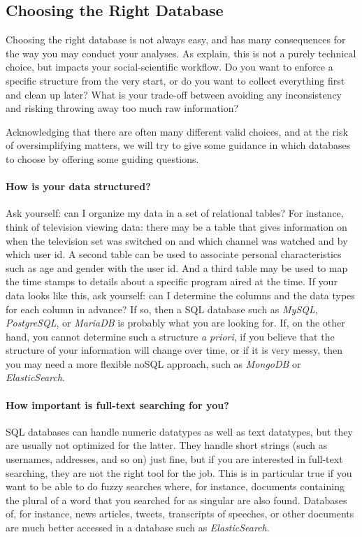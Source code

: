 \subsection{Choosing the Right Database}\label{sec:rightdb}

Choosing the right database is not always easy, and has many consequences
for the way you may conduct your analyses. As \citet{Gunther2018} explain,
this is not a purely technical choice, but impacts your social-scientific
workflow. Do you want to enforce a specific structure from the very
start, or do you  want to collect everything first and clean up
later? What is your trade-off between avoiding any inconsistency and risking
 throwing away too much raw information?

Acknowledging that there are often many different valid choices, and at
the risk of oversimplifying matters, we will try to give some guidance
in which databases to choose by offering some guiding questions.


\paragraph[How is your data structured?]{How is your data structured?}
Ask yourself: can I organize my data
in a set of relational tables? For instance, think of television
viewing data: there may be a table that gives information on when the
television set was switched on and which channel was watched and by
which user id. A second table can be used to associate personal
characteristics such as age and gender with the user id. And a third
table may be used to map the time stamps to details about a specific
program aired at the time.  If your data looks like this, ask
yourself: can I determine the columns and the data types for each
column in advance?  If so, then a SQL database such as \emph{MySQL},
\emph{PostgreSQL}, or \emph{MariaDB} is probably what you are looking
for. If, on the other hand, you cannot determine such a structure \emph{a
priori}, if you believe that the structure of your information will
change over time, or if it is very messy, then you may need a more
flexible noSQL approach, such as \emph{MongoDB} or
\emph{ElasticSearch}.

\paragraph[How important is full-text searching for you?]{How important is full-text searching for you?}
SQL databases can handle numeric datatypes as well as text datatypes, but they are usually not optimized for the latter. They handle short strings (such as usernames, addresses, and so on) just fine, but if you are interested in full-text searching, they are not the right tool for the job. This is in particular true if you want to be able to do fuzzy searches where, for instance,  documents containing the plural of a word that you searched for as singular are also found. Databases of, for instance, news articles, tweets, transcripts of speeches, or other documents are much better accessed in a database such as \emph{ElasticSearch}.


